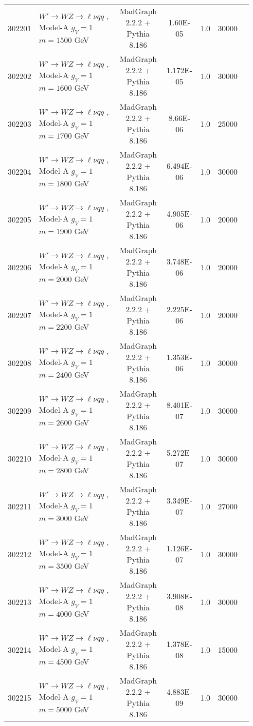 \begin{landscape}
\begin{table}[!htb]
\begin{footnotesize}
\begin{center}
\begin{tabular}{|c|l|c|c|c|c|r|}
					302201 & $W' \to WZ \to \ell\nu qq $ , Model-A $g_V=1$ $m=1500$ GeV& MadGraph 2.2.2 + Pythia 8.186 & 1.60E-05  & 1.0& 30000 \\ 
					302202 & $W' \to WZ \to \ell\nu qq $ , Model-A $g_V=1$ $m=1600$ GeV& MadGraph 2.2.2 + Pythia 8.186 & 1.172E-05 & 1.0& 30000 \\ 
					302203 & $W' \to WZ \to \ell\nu qq $ , Model-A $g_V=1$ $m=1700$ GeV& MadGraph 2.2.2 + Pythia 8.186 & 8.66E-06  & 1.0& 25000 \\ 
					302204 & $W' \to WZ \to \ell\nu qq $ , Model-A $g_V=1$ $m=1800$ GeV& MadGraph 2.2.2 + Pythia 8.186 & 6.494E-06 & 1.0& 30000 \\ 
					302205 & $W' \to WZ \to \ell\nu qq $ , Model-A $g_V=1$ $m=1900$ GeV& MadGraph 2.2.2 + Pythia 8.186 & 4.905E-06 & 1.0& 20000 \\ 
					302206 & $W' \to WZ \to \ell\nu qq $ , Model-A $g_V=1$ $m=2000$ GeV& MadGraph 2.2.2 + Pythia 8.186 & 3.748E-06 & 1.0& 20000 \\
					302207 & $W' \to WZ \to \ell\nu qq $ , Model-A $g_V=1$ $m=2200$ GeV& MadGraph 2.2.2 + Pythia 8.186 & 2.225E-06 & 1.0& 20000 \\
					302208 & $W' \to WZ \to \ell\nu qq $ , Model-A $g_V=1$ $m=2400$ GeV& MadGraph 2.2.2 + Pythia 8.186 & 1.353E-06 & 1.0& 30000 \\
					302209 & $W' \to WZ \to \ell\nu qq $ , Model-A $g_V=1$ $m=2600$ GeV& MadGraph 2.2.2 + Pythia 8.186 & 8.401E-07 & 1.0& 30000 \\
					302210 & $W' \to WZ \to \ell\nu qq $ , Model-A $g_V=1$ $m=2800$ GeV& MadGraph 2.2.2 + Pythia 8.186 & 5.272E-07 & 1.0& 30000 \\
					302211 & $W' \to WZ \to \ell\nu qq $ , Model-A $g_V=1$ $m=3000$ GeV& MadGraph 2.2.2 + Pythia 8.186 & 3.349E-07 & 1.0& 27000 \\
					302212 & $W' \to WZ \to \ell\nu qq $ , Model-A $g_V=1$ $m=3500$ GeV& MadGraph 2.2.2 + Pythia 8.186 & 1.126E-07 & 1.0& 30000 \\
					302213 & $W' \to WZ \to \ell\nu qq $ , Model-A $g_V=1$ $m=4000$ GeV& MadGraph 2.2.2 + Pythia 8.186 & 3.908E-08 & 1.0& 30000 \\
					302214 & $W' \to WZ \to \ell\nu qq $ , Model-A $g_V=1$ $m=4500$ GeV& MadGraph 2.2.2 + Pythia 8.186 & 1.378E-08 & 1.0& 15000 \\
					302215 & $W' \to WZ \to \ell\nu qq $ , Model-A $g_V=1$ $m=5000$ GeV& MadGraph 2.2.2 + Pythia 8.186 & 4.883E-09 & 1.0 & 30000 \\
					\hline
				\end{tabular}
			\end{center}
		\end{footnotesize}
	\end{table}
	

\end{landscape}
